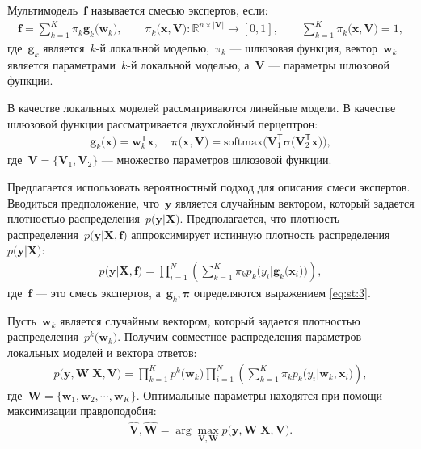 \begin{definition}
\label{def:2}
Мультимодель~$\mathbf{f}$ называется смесью экспертов, если:
\[
\label{eq:st:2}
\begin{aligned}
\mathbf{f} = \sum_{k=1}^{K}\pi_{k}\mathbf{g}_k\bigr(\mathbf{w}_k\bigr), \qquad \pi_{k}\bigr(\mathbf{x}, \mathbf{V}\bigr):\mathbb{R}^{n\times \left|\mathbf{V}\right|} \to [0, 1], \qquad \sum_{k=1}^{K}\pi_{k}\bigr(\mathbf{x}, \mathbf{V}\bigr) = 1,
\end{aligned}
\]
где~$\mathbf{g}_k$ является~$k$-й локальной моделью,~$\pi_k$ --- шлюзовая функция, вектор~$\mathbf{w}_k$ является параметрами~$k$-й локальной моделью, а~$\mathbf{V}$ --- параметры шлюзовой функции.
\end{definition}

В качестве локальных моделей рассматриваются линейные модели. В качестве шлюзовой функции рассматривается двухслойный перцептрон:
\[
\label{eq:st:3}
\begin{aligned}
\mathbf{g}_k\bigr(\textbf{x}\bigr) = \textbf{w}_k^{\mathsf{T}}\textbf{x}, \quad
\bm{\pi}\bigr(\mathbf{x}, \mathbf{V}\bigr) = \text{softmax}\bigr(\mathbf{V}_{1}^{\mathsf{T}}\bm{\sigma}\bigr(\mathbf{V}_2^{\mathsf{T}}\mathbf{x}\bigr)\bigr),
\end{aligned}
\]
где~$\mathbf{V} = \bigr\{\mathbf{V}_1, \mathbf{V}_2\bigr\}$ --- множество параметров шлюзовой функции.

Предлагается использовать вероятностный подход для описания смеси экспертов. Вводиться предположение, что~$\textbf{y}$ является случайным вектором, который задается плотностью распределения~$p\bigr(\textbf{y}|\textbf{X}\bigr)$. Предполагается, что плотность распределения~$p\bigr(\textbf{y}|\textbf{X}, \textbf{f}\bigr)$ аппроксимирует истинную плотность распределения~$p\bigr(\textbf{y}|\textbf{X}\bigr)$:
\[
\label{eq:st:new:1}
\begin{aligned}
p\bigr(\textbf{y}|\textbf{X}, \textbf{f}\bigr) = \prod_{i=1}^{N}\left(\sum_{k=1}^{K}\pi_kp_{k}\bigr(y_{i}|\textbf{g}_{k}\bigr(\mathbf{x}_{i}\bigr)\bigr)\right),
\end{aligned}
\]
где~$\textbf{f}$ --- это смесь экспертов, а~$\textbf{g}_k, \bm{\pi}$ определяются выражением \eqref{eq:st:3}.

Пусть~$\textbf{w}_k$ является случайным вектором, который задается плотностью распределения~$p^{k}\bigr(\mathbf{w}_k\bigr)$. Получим совместное распределения параметров локальных моделей и вектора ответов:
\[
\label{eq:st:4}
\begin{aligned}
p\bigr(\mathbf{y}, \mathbf{W}|\mathbf{X}, \mathbf{V}\bigr) = \prod_{k=1}^{K}p^{k}\bigr(\mathbf{w}_k\bigr)\prod_{i=1}^{N}\left(\sum_{k=1}^{K}\pi_{k}p_{k}\bigr(y_i|\mathbf{w}_k, \mathbf{x}_i\bigr)\right),
\end{aligned}
\]
где~$\mathbf{W} = \bigr\{\mathbf{w}_1, \mathbf{w}_2, \cdots, \mathbf{w}_K\bigr\}.$
Оптимальные параметры находятся при помощи максимизации правдоподобия:
\[
\label{eq:st:5}
\begin{aligned}
\hat{\mathbf{V}}, \hat{ \mathbf{W}} = \arg\max_{\mathbf{V}, \mathbf{W}} p\bigr(\mathbf{y},  \mathbf{W}|\mathbf{X}, \mathbf{V}\bigr).
\end{aligned}
\]

